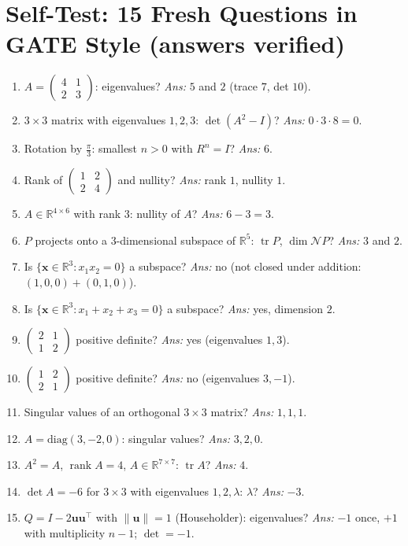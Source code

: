 \documentclass[11pt,a4paper]{article}
\newcommand{\R}{\mathbb{R}}
\newcommand{\rank}{\operatorname{rank}}
\newcommand{\tr}{\operatorname{tr}}
\newcommand{\Null}{\mathcal{N}}
\begin{document}
\section{Self-Test: 15 Fresh Questions in GATE Style (answers verified)}
\begin{enumerate}[leftmargin=*,itemsep=3pt]
\item $A=\begin{pmatrix}4&1\\2&3\end{pmatrix}$: eigenvalues? \emph{Ans:} $5$ and $2$ (trace $7$, det $10$).
\item $3\times3$ matrix with eigenvalues $1,2,3$: $\det(A^2-I)$? \emph{Ans:} $0\cdot3\cdot8=0$.
\item Rotation by $\frac\pi3$: smallest $n>0$ with $R^n=I$? \emph{Ans:} $6$.
\item Rank of $\begin{pmatrix}1&2\\2&4\end{pmatrix}$ and nullity? \emph{Ans:} rank $1$, nullity $1$.
\item $A\in\R^{4\times6}$ with rank $3$: nullity of $A$? \emph{Ans:} $6-3=3$.
\item $P$ projects onto a $3$-dimensional subspace of $\R^5$: $\tr P$, $\dim\Null P$? \emph{Ans:} $3$ and $2$.
\item Is $\{\mathbf x\in\R^3:x_1x_2=0\}$ a subspace? \emph{Ans:} no (not closed under addition: $(1,0,0)+(0,1,0)$).
\item Is $\{\mathbf x\in\R^3:x_1+x_2+x_3=0\}$ a subspace? \emph{Ans:} yes, dimension $2$.
\item $\begin{pmatrix}2&1\\1&2\end{pmatrix}$ positive definite? \emph{Ans:} yes (eigenvalues $1,3$).
\item $\begin{pmatrix}1&2\\2&1\end{pmatrix}$ positive definite? \emph{Ans:} no (eigenvalues $3,-1$).
\item Singular values of an orthogonal $3\times3$ matrix? \emph{Ans:} $1,1,1$.
\item $A=\mathrm{diag}(3,-2,0)$: singular values? \emph{Ans:} $3,2,0$.
\item $A^2=A$, $\rank A=4$, $A\in\R^{7\times7}$: $\tr A$? \emph{Ans:} $4$.
\item $\det A=-6$ for $3\times3$ with eigenvalues $1,2,\lambda$: $\lambda$? \emph{Ans:} $-3$.
\item $Q=I-2\mathbf u\mathbf u^\top$ with $\|\mathbf u\|=1$ (Householder): eigenvalues? \emph{Ans:} $-1$ once, $+1$ with multiplicity $n-1$; $\det=-1$.
\end{enumerate}
\end{document}
